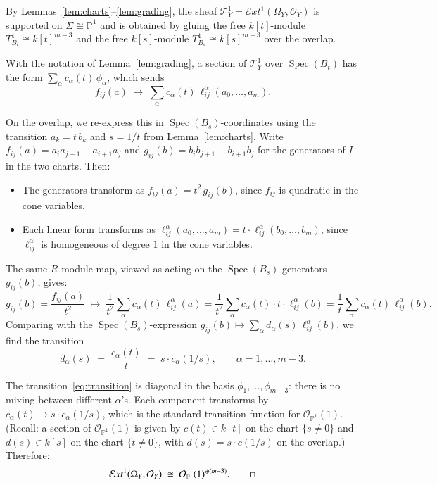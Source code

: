\documentclass[11pt,twoside]{amsart}
\theoremstyle{plain}
\numberwithin{equation}{section}
\DeclareMathOperator{\Spec}{Spec}
\newcommand{\OO}{\mathcal{O}}
\newcommand{\PP}{\mathbb{P}}
\newcommand{\Tt}{\mathcal{T}}
\theoremstyle{definition}
\begin{document}
By Lemmas~\ref{lem:charts}--\ref{lem:grading}, the sheaf $\Tt^1_Y = \mathcal{E}xt^1(\Omega_Y, \OO_Y)$ is supported on $\Sigma \cong \PP^1$ and is obtained by gluing the free $k[t]$-module $T^1_{B_t} \cong k[t]^{m-3}$ and the free $k[s]$-module $T^1_{B_s} \cong k[s]^{m-3}$ over the overlap.
 
With the notation of Lemma~\ref{lem:grading}, a section of $\Tt^1_Y$ over $\Spec(B_t)$ has the form $\sum_\alpha c_\alpha(t)\, \phi_\alpha$, which sends
\[
f_{ij}(a) \;\longmapsto\; \sum_\alpha c_\alpha(t)\, \ell^\alpha_{ij}(a_0, \ldots, a_m).
\]
 
On the overlap, we re-express this in $\Spec(B_s)$-coordinates using the transition $a_k = t\, b_k$ and $s = 1/t$ from Lemma~\ref{lem:charts}. Write $f_{ij}(a) = a_i a_{j+1} - a_{i+1}a_j$ and $g_{ij}(b) = b_i b_{j+1} - b_{i+1}b_j$ for the generators of $I$ in the two charts. Then:
\begin{itemize}
\item The generators transform as $f_{ij}(a) = t^2\, g_{ij}(b)$, since $f_{ij}$ is quadratic in the cone variables.
\item Each linear form transforms as $\ell^\alpha_{ij}(a_0, \ldots, a_m) = t \cdot \ell^\alpha_{ij}(b_0, \ldots, b_m)$, since $\ell^\alpha_{ij}$ is homogeneous of degree $1$ in the cone variables.
\end{itemize}
The same $R$-module map, viewed as acting on the $\Spec(B_s)$-generators $g_{ij}(b)$, gives:
\[
g_{ij}(b) = \frac{f_{ij}(a)}{t^2} \;\longmapsto\; \frac{1}{t^2} \sum_\alpha c_\alpha(t)\, \ell^\alpha_{ij}(a) = \frac{1}{t^2} \sum_\alpha c_\alpha(t) \cdot t \cdot \ell^\alpha_{ij}(b) = \frac{1}{t}\sum_\alpha c_\alpha(t)\, \ell^\alpha_{ij}(b).
\]
Comparing with the $\Spec(B_s)$-expression $g_{ij}(b) \mapsto \sum_\alpha d_\alpha(s)\, \ell^\alpha_{ij}(b)$, we find the transition
\begin{equation}\label{eq:transition}
d_\alpha(s) \;=\; \frac{c_\alpha(t)}{t} \;=\; s \cdot c_\alpha(1/s), \qquad \alpha = 1, \ldots, m-3.
\end{equation}
 
The transition~\eqref{eq:transition} is diagonal in the basis $\phi_1, \ldots, \phi_{m-3}$: there is no mixing between different $\alpha$'s. Each component transforms by $c_\alpha(t) \mapsto s \cdot c_\alpha(1/s)$, which is the standard transition function for $\OO_{\PP^1}(1)$. (Recall: a section of $\OO_{\PP^1}(1)$ is given by $c(t) \in k[t]$ on the chart $\{s \neq 0\}$ and $d(s) \in k[s]$ on the chart $\{t \neq 0\}$, with $d(s) = s \cdot c(1/s)$ on the overlap.) Therefore:
\[
\mathcal{E}xt^1(\Omega_Y, \OO_Y) \;\cong\; \OO_{\PP^1}(1)^{\oplus(m-3)}. \qed
\]
 
\end{document}
